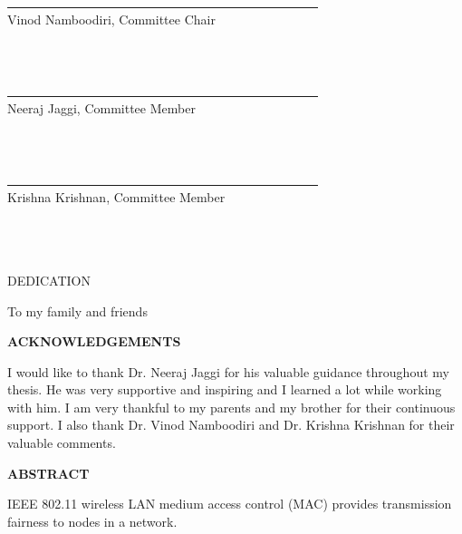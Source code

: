 \documentclass[12pt,letterpaper,english]{article}
\begin{document}
\noindent \underline{~~~~~~~~~~~~~~~~~~~~~~~~~~~~~~~~~~~~~~~~~~~~~~~~~}\\
\noindent Vinod Namboodiri, Committee Chair\\ \\ \\ \\
\noindent \underline{~~~~~~~~~~~~~~~~~~~~~~~~~~~~~~~~~~~~~~~~~~~~~~~~~}\\
\noindent Neeraj Jaggi, Committee Member\\ \\ \\ \\
\noindent \underline{~~~~~~~~~~~~~~~~~~~~~~~~~~~~~~~~~~~~~~~~~~~~~~~~~}\\
\noindent Krishna Krishnan, Committee Member\\ \\ \\ \\
\newpage
\begin{center}DEDICATION\end{center}
\singlespacing
\vspace{2.0in}
\begin{center}
To my family and friends
\end{center}
\doublespacing
\newpage
\begin{center}\textbf{ACKNOWLEDGEMENTS}\end{center}
\doublespacing
\hspace{0.5in}I would like to thank Dr. Neeraj Jaggi for his valuable guidance throughout my thesis. He was very supportive and inspiring and I learned a lot while working with him. 
I am very thankful to my parents and my brother for their continuous support.
I also thank Dr. Vinod Namboodiri and Dr. Krishna Krishnan for their valuable comments.
\newpage
\begin{center}\textbf{ABSTRACT}\end{center}
\doublespacing
\hspace{0.5in}IEEE 802.11 wireless LAN medium access control (MAC) provides transmission fairness to nodes in a network. 
\end{document}
